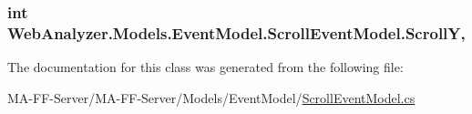\subsubsection[{Scroll\+Y}]{\setlength{\rightskip}{0pt plus 5cm}int Web\+Analyzer.\+Models.\+Event\+Model.\+Scroll\+Event\+Model.\+Scroll\+Y\hspace{0.3cm}{\ttfamily [get]}, {\ttfamily [set]}}\label{class_web_analyzer_1_1_models_1_1_event_model_1_1_scroll_event_model_a3e94660e7ec7eb2af5fc06022fbddbcd}


The documentation for this class was generated from the following file\+:\begin{DoxyCompactItemize}
\item 
M\+A-\/\+F\+F-\/\+Server/\+M\+A-\/\+F\+F-\/\+Server/\+Models/\+Event\+Model/\hyperlink{_scroll_event_model_8cs}{Scroll\+Event\+Model.\+cs}\end{DoxyCompactItemize}
